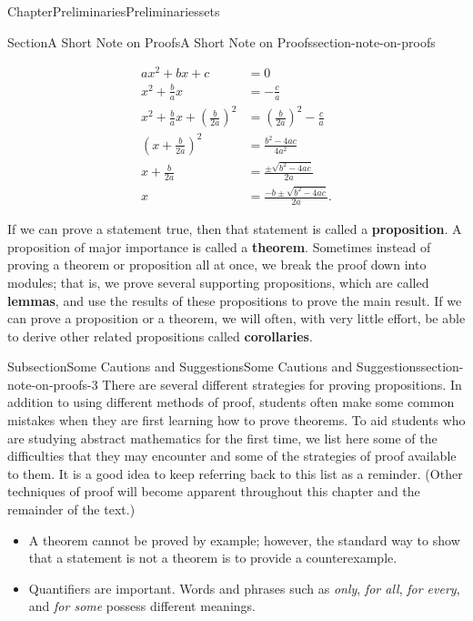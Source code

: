 \documentclass[oneside,10pt,]{book}
\newcommand{\terminology}[1]{\textbf{#1}}
\numberwithin{equation}{section}
\begin{document}
\begin{chapterptx}{Chapter}{Preliminaries}{}{Preliminaries}{}{}{sets}
\begin{sectionptx}{Section}{A Short Note on Proofs}{}{A Short Note on Proofs}{}{}{section-note-on-proofs}
\begin{introduction}{}
\begin{align*}
ax^2 + bx + c & =  0\\
x^2 + \frac{b}{a}x & =  - \frac{c}{a}\\
x^2 + \frac{b}{a}x + \left( \frac{b}{2a} \right)^2 & =  \left( \frac{b}{2a} \right)^2 - \frac{c}{a}\\
\left(x + \frac{b}{2a} \right)^2 & =  \frac{b^2 - 4ac}{4a^2}\\
x + \frac{b}{2a}  & =  \frac{ \pm \sqrt{ b^2 -4ac}}{2a}\\
x & =  \frac{-b \pm \sqrt{b^2 - 4ac}}{2a}\text{.}
\end{align*}
%
\par
If we can prove a statement true, then that statement is called a \terminology{proposition}.  A proposition of major importance is called a \terminology{theorem}.  Sometimes instead of proving a theorem or proposition all at once, we break the proof down into modules; that is, we prove several supporting propositions, which are called \terminology{lemmas}, and use the results of these propositions to prove the main result. If we can prove a proposition or a theorem, we will often, with very little effort, be able to derive other related propositions called \terminology{corollaries}.%
\end{introduction}%
%
%
\typeout{************************************************}
\typeout{************************************************}
%
\begin{subsectionptx}{Subsection}{Some Cautions and Suggestions}{}{Some Cautions and Suggestions}{}{}{section-note-on-proofs-3}
There are several different strategies for proving propositions.  In addition to using different methods of proof, students often make some common mistakes when they are first learning how to prove theorems. To aid students who are studying abstract mathematics for the first time, we list here some of the difficulties that they may encounter and some of the strategies of proof available to them. It is a good idea to keep referring back to this list as a reminder. (Other techniques of proof will become apparent throughout this chapter and the remainder of the text.)%
\begin{itemize}[label=\textbullet]
\item{}A theorem cannot be proved by example; however, the standard way to show that a statement is not a theorem is to provide a counterexample.%
\item{}Quantifiers are important. Words and phrases such as \emph{only}, \emph{for all}, \emph{for every}, and \emph{for some} possess different meanings.%

\end{itemize}
\end{subsectionptx}
\end{sectionptx}
\end{chapterptx}
\end{document}
